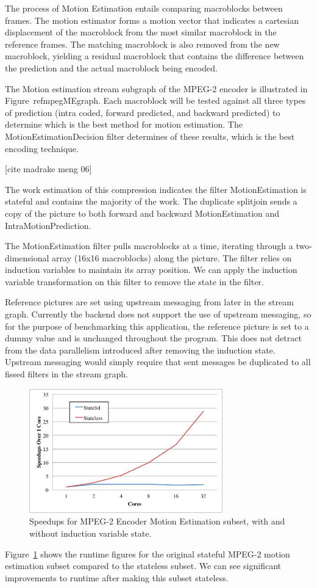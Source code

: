 The process of Motion Estimation entails comparing macroblocks between frames.  The motion estimator forms a motion vector that indicates a cartesian displacement of the macroblock from the most similar macroblock in the reference frames.  The matching macroblock is also removed from the new macroblock, yielding a residual macroblock that contains the difference between the prediction and the actual macroblock being encoded.  

The Motion estimation stream subgraph of the MPEG-2 encoder is illustrated in Figure~ref{mpegMEgraph}.  Each macroblock will be tested against all three types of prediction (intra coded, forward predicted, and backward predicted) to determine which is the best method for motion estimation.  The MotionEstimationDecision filter determines of these results, which is the best encoding technique.

[cite madrake meng 06]

The work estimation of this compression indicates the filter MotionEstimation is stateful and contains the majority of the work.  The duplicate splitjoin sends a copy of the picture to both forward and backward MotionEstimation and IntraMotionPrediction.  

The MotionEstimation filter pulls macroblocks at a time, iterating through a two-dimensional array (16x16 macroblocks) along the picture.  The filter relies on induction variables to maintain its array position.  We can apply the induction variable transformation on this filter to remove the state in the filter.

Reference pictures are set using upstream messaging from later in the stream graph.  Currently the backend does not support the use of upstream messaging, so for the purpose of benchmarking this application, the reference picture is set to a dummy value and is unchanged throughout the program.  This does not detract from the data parallelism introduced after removing the induction state.  Upstream messaging would simply require that sent messages be duplicated to all fissed filters in the stream graph.

\begin{figure}[t]
\includegraphics[width=3.3in]{figures/mpeg-results.pdf}
\caption{Speedups for MPEG-2 Encoder Motion Estimation subset, with and without induction variable state.  \protect\label{fig:mpeg-results}}
\end{figure}

Figure~\ref{fig:mpeg-results} shows the runtime figures for the original stateful MPEG-2 motion estimation subset compared to the stateless subset.  We can see significant improvements to runtime after making this subset stateless.  